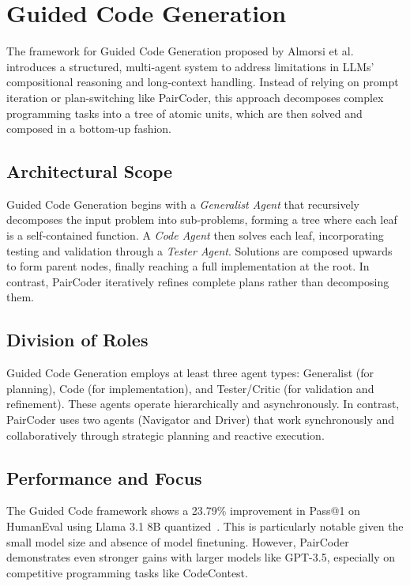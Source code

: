 \documentclass[11pt,a4paper]{article}
\begin{document}
\section{Guided Code Generation}
The framework for Guided Code Generation proposed by Almorsi et al.\cite{almorsi2025guided} introduces a structured, multi-agent system to address limitations in LLMs' compositional reasoning and long-context handling. Instead of relying on prompt iteration or plan-switching like PairCoder, this approach decomposes complex programming tasks into a tree of atomic units, which are then solved and composed in a bottom-up fashion.

\subsection{Architectural Scope}
Guided Code Generation begins with a \textit{Generalist Agent} that recursively decomposes the input problem into sub-problems, forming a tree where each leaf is a self-contained function. A \textit{Code Agent} then solves each leaf, incorporating testing and validation through a \textit{Tester Agent}. Solutions are composed upwards to form parent nodes, finally reaching a full implementation at the root. In contrast, PairCoder iteratively refines complete plans rather than decomposing them.

\subsection{Division of Roles}
Guided Code Generation employs at least three agent types: Generalist (for planning), Code (for implementation), and Tester/Critic (for validation and refinement). These agents operate hierarchically and asynchronously. In contrast, PairCoder uses two agents (Navigator and Driver) that work synchronously and collaboratively through strategic planning and reactive execution.

\subsection{Performance and Focus}
The Guided Code framework shows a 23.79\% improvement in Pass@1 on HumanEval using Llama 3.1 8B quantized~\cite{almorsi2025guided}. This is particularly notable given the small model size and absence of model finetuning. However, PairCoder demonstrates even stronger gains with larger models like GPT-3.5, especially on competitive programming tasks like CodeContest.
\end{document}
